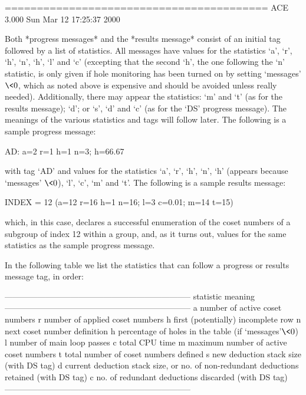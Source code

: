 \begintt
=========================================
ACE 3.000        Sun Mar 12 17:25:37 2000
\endtt

Both *progress messages* and  the  *results  message*  consist  of  an
initial tag followed by a list of statistics. All messages have values
for the statistics `a', `r', `h', `n', `h',  `l'  and  `c'  (excepting
that the second `h', the one following  the  `n'  statistic,  is  only
given if hole monitoring has been turned on by setting `messages'  $\<
0$, which as noted above is expensive and  should  be  avoided  unless
really needed). Additionally, there may appear the statistics: `m' and
`t' (as for the results message); `d'; or `s', `d' and `c' (as for the
`DS' progress message). The meanings of  the  various  statistics  and
tags will follow later. The following is a sample progress message:

\begintt
AD: a=2 r=1 h=1 n=3; h=66.67%
\endtt

with tag `AD' and values for the statistics `a', `r',  `h',  `n',  `h'
(appears because `messages' $\<  0$),  `l',  `c',  `m'  and  `t'.  The
following is a sample results message:

\begintt
INDEX = 12 (a=12 r=16 h=1 n=16; l=3 c=0.01; m=14 t=15)
\endtt

which, in this case, declares a successful enumeration  of  the  coset
numbers of a subgroup of index 12 within a group,  and,  as  it  turns
out, values for the same statistics as the sample progress message.

In the following table we  list  the  statistics  that  can  follow  a
progress or results message tag, in order:

\begintt
--------------------------------------------------------------------
statistic   meaning
--------------------------------------------------------------------
a           number of active coset numbers
r           number of applied coset numbers
h           first (potentially) incomplete row
n           next coset number definition
h           percentage of holes in the table (if `messages'$ \< 0$) 
l           number of main loop passes
c           total CPU time
m           maximum number of active coset numbers
t           total number of coset numbers defined
s           new deduction stack size (with DS tag)
d           current deduction stack size, or
              no. of non-redundant deductions retained (with DS tag)
c           no. of redundant deductions discarded (with DS tag)
--------------------------------------------------------------------
\endtt

